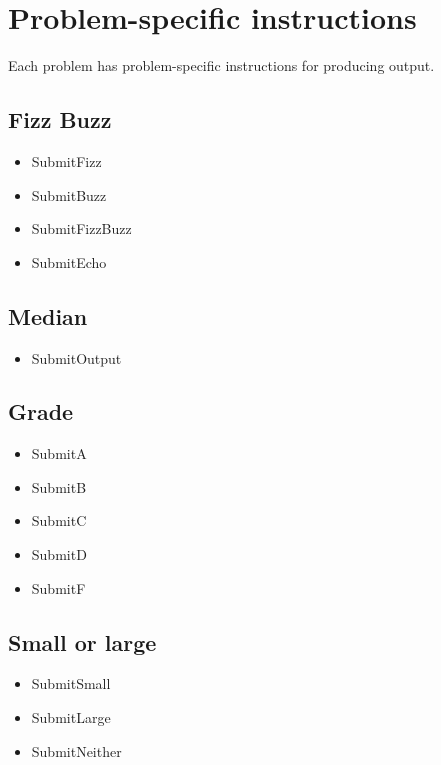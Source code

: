 \documentclass[
]{book}
\providecommand{\tightlist}{%
  \setlength{\itemsep}{0pt}\setlength{\parskip}{0pt}}
\begin{document}
\hypertarget{problem-specific-instructions}{%
\section{Problem-specific instructions}\label{problem-specific-instructions}}

Each problem has problem-specific instructions for producing output.

\hypertarget{fizz-buzz}{%
\subsection{Fizz Buzz}\label{fizz-buzz}}

\begin{itemize}
\tightlist
\item
  SubmitFizz
\item
  SubmitBuzz
\item
  SubmitFizzBuzz
\item
  SubmitEcho
\end{itemize}

\hypertarget{median}{%
\subsection{Median}\label{median}}

\begin{itemize}
\tightlist
\item
  SubmitOutput
\end{itemize}

\hypertarget{grade}{%
\subsection{Grade}\label{grade}}

\begin{itemize}
\tightlist
\item
  SubmitA
\item
  SubmitB
\item
  SubmitC
\item
  SubmitD
\item
  SubmitF
\end{itemize}

\hypertarget{small-or-large}{%
\subsection{Small or large}\label{small-or-large}}

\begin{itemize}
\tightlist
\item
  SubmitSmall
\item
  SubmitLarge
\item
  SubmitNeither
\end{itemize}
\end{document}
